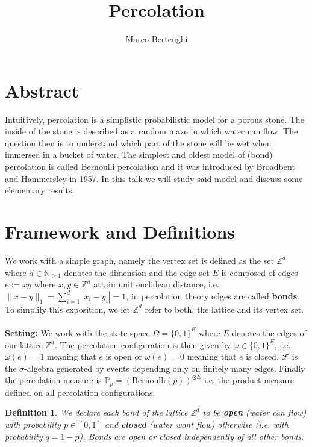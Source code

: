 \documentclass[12pt,a4paper]{article}
\author{Marco Bertenghi}
\title{Percolation}
\newtheorem{defn}{Definition}[section]
\theoremstyle{definition}
\begin{document}
\maketitle
\section{Abstract}
Intuitively, percolation is a simplistic probabilistic model for a porous stone. The inside of the stone is described as a random maze in which water can flow. The question then is to understand which part of the stone will be wet when immersed in a bucket of water. The simplest and oldest model of (bond) percolation is called Bernoulli percolation and it was introduced by Broadbent and Hammersley in 1957. In this talk we will study said model and discuss some elementary results. 
\section{Framework and Definitions}
We work with a simple graph, namely the vertex set is defined as the set $\mathbb{Z}^d$ where $d \in \mathbb{N}_{ \geq 1}$ denotes the dimension and the edge set $E$ is composed of edges $e:=xy$ where $x,y \in \mathbb{Z}^d$ attain unit euclidean distance, i.e. $\|x-y\|_1 = \sum_{i=1}^d |x_i-y_i| = 1$, in percolation theory edges are called \textbf{bonds}. To simplify this exposition, we let $\mathbb{Z}^d$ refer to both, the lattice and its vertex set. 
\\\\
\textbf{Setting:} We work with the state space $\Omega=\{0,1\}^E$ where $E$ denotes the edges of our lattice $\mathbb{Z}^d$. The percolation configuration is then given by $\omega \in \{ 0,1\}^E$, i.e. $\omega(e) =1$ meaning that $e$ is open or $\omega(e)=0$ meaning that $e$ is closed. $\mathcal{F}$ is the $\sigma$-algebra generated by events depending only on finitely many edges. Finally the percolation measure is $\mathbb{P}_p=(\text{Bernoulli}(p))^{\otimes E}$ i.e. the product measure defined on all percolation configurations. 

\begin{defn} We declare each bond of the lattice $\mathbb{Z}^d$ to be \textbf{open} \textit{(water can flow)} with probability $p \in [0,1]$ and \textbf{closed} \textit{(water wont flow)} otherwise (i.e. with probability $q=1-p$). Bonds are open or closed independently of all other bonds. 
\end{defn}
\end{document}
